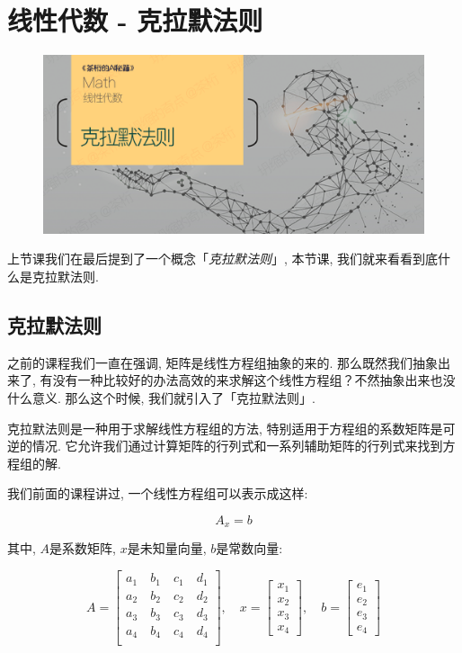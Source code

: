\chapter{线性代数 - 克拉默法则}

\begin{figure}[ht]
  \centering
  \includegraphics[width=1\linewidth]{asset/20230908142745.png}
\end{figure}

\newpage

上节课我们在最后提到了一个概念「\textit{克拉默法则}」, 本节课, 我们就来看看到底什么是克拉默法则. 

\hypertarget{15.线性代数}{}
\section{克拉默法则}

之前的课程我们一直在强调, 矩阵是线性方程组抽象的来的. 那么既然我们抽象出来了, 有没有一种比较好的办法高效的来求解这个线性方程组？不然抽象出来也没什么意义. 那么这个时候, 我们就引入了「克拉默法则」. 

克拉默法则是一种用于求解线性方程组的方法, 特别适用于方程组的系数矩阵是可逆的情况. 它允许我们通过计算矩阵的行列式和一系列辅助矩阵的行列式来找到方程组的解. 

我们前面的课程讲过, 一个线性方程组可以表示成这样: 

\[
  A_x = b
\]

其中, $A$是系数矩阵, $x$是未知量向量, $b$是常数向量: 

\[
  A = 
  \begin{bmatrix}
  a_1 \quad b_1 \quad c_1 \quad  d_1 \\
  a_2 \quad b_2 \quad c_2 \quad  d_2 \\ 
  a_3 \quad b_3 \quad c_3 \quad  d_3 \\
  a_4 \quad b_4 \quad c_4 \quad  d_4 \\
  \end{bmatrix}, \quad
  x = 
  \begin{bmatrix}
  x_1 \\
  x_2 \\
  x_3 \\
  x_4
  \end{bmatrix}, \quad
  b = 
  \begin{bmatrix}
  e_1 \\
  e_2 \\
  e_3 \\
  e_4
  \end{bmatrix}
\]

